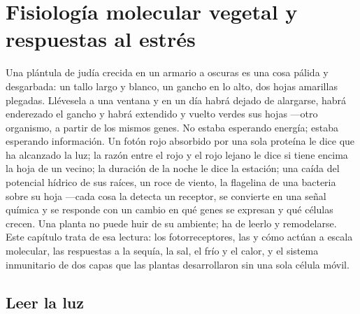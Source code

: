 \chapter{Fisiología molecular vegetal y respuestas al estrés}\label{ch:b3:plant-molecular-physiology}

Una plántula de judía crecida en un armario a oscuras es una cosa
pálida y desgarbada: un tallo largo y blanco, un gancho en lo alto, dos
hojas amarillas plegadas. Llévesela a una ventana y en un día habrá
dejado de alargarse, habrá enderezado el gancho y habrá extendido y
vuelto verdes sus hojas ---otro organismo, a partir de los mismos
genes. No estaba esperando energía; estaba esperando información. Un
fotón rojo absorbido por una sola proteína le dice que ha alcanzado la
luz; la razón entre el rojo y el rojo lejano le dice si tiene encima la
hoja de un vecino; la duración de la noche le dice la estación; una
caída del potencial hídrico de sus raíces, un roce de viento, la
flagelina de una bacteria sobre su hoja ---cada cosa la detecta un
receptor, se convierte en una señal química y se responde con un cambio
en qué genes se expresan y qué células crecen. Una planta no puede huir
de su ambiente; ha de leerlo y remodelarse. Este capítulo trata de esa
lectura: los fotorreceptores, las  y cómo actúan a escala
molecular, las respuestas a la sequía, la sal, el frío y el calor, y el
sistema inmunitario de dos capas que las plantas desarrollaron sin una
sola célula móvil.

\section{Leer la luz}

